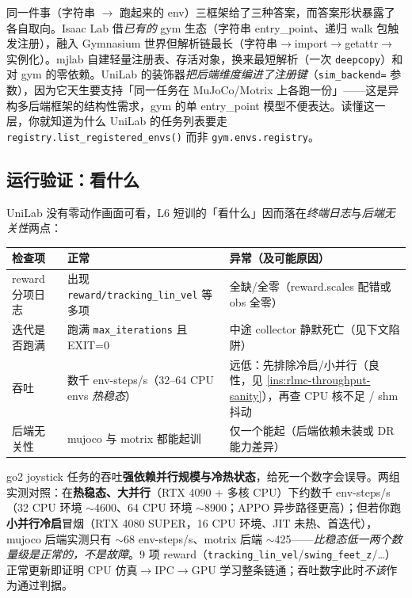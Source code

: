 \begin{insight}\label{ins:rlmc-three-registries}
同一件事（字符串 $\to$ 跑起来的 env）三框架给了三种答案，而答案形状暴露了各自取向。Isaac Lab 借\emph{已有的} gym 生态（字符串 entry\_point、递归 walk 包触发注册），融入 Gymnasium 世界但解析链最长（字符串$\to$import$\to$getattr$\to$实例化）。mjlab 自建轻量注册表、存活对象，换来最短解析（一次 \verb|deepcopy|）和对 gym 的零依赖。UniLab 的装饰器\emph{把后端维度编进了注册键}（\verb|sim_backend=| 参数），因为它天生要支持「同一任务在 MuJoCo/Motrix 上各跑一份」——这是异构多后端框架的结构性需求，gym 的单 entry\_point 模型不便表达。读懂这一层，你就知道为什么 UniLab 的任务列表要走 \verb|registry.list_registered_envs()| 而非 \verb|gym.envs.registry|。
\end{insight}

\subsection{运行验证：看什么}

UniLab 没有零动作画面可看，L6 短训的「看什么」因而落在\emph{终端日志}与\emph{后端无关性}两点：

\begin{center}
\small
\begin{tabular}{@{}lll@{}}
\toprule
检查项 & 正常 & 异常（及可能原因） \\
\midrule
reward 分项日志 & 出现 \verb|reward/tracking_lin_vel| 等多项 & 全缺/全零（reward.scales 配错或 obs 全零） \\
迭代是否跑满 & 跑满 \verb|max_iterations| 且 EXIT=0 & 中途 collector 静默死亡（见下文陷阱） \\
吞吐 & 数千 env-steps/s（32--64 CPU envs \emph{热稳态}） & 远低：先排除冷启/小并行（良性，见 \cref{ins:rlmc-throughput-sanity}），再查 CPU 核不足 / shm 抖动 \\
后端无关性 & mujoco 与 motrix 都能起训 & 仅一个能起（后端依赖未装或 DR 能力差异） \\
\bottomrule
\end{tabular}
\end{center}

go2 joystick 任务的吞吐\textbf{强依赖并行规模与冷热状态}，给死一个数字会误导。两组实测对照：在\textbf{热稳态、大并行}（RTX 4090 + 多核 CPU）下约数千 env-steps/s（32 CPU 环境 $\sim$4600、64 CPU 环境 $\sim$8900；APPO 异步路径更高）；但若你跑\textbf{小并行冷启}冒烟（RTX 4080 SUPER，16 CPU 环境、JIT 未热、首迭代），mujoco 后端实测只有 $\sim$68 env-steps/s、motrix 后端 $\sim$425——\emph{比稳态低一两个数量级是正常的，不是故障}。9 项 reward（\verb|tracking_lin_vel|/\verb|swing_feet_z|/\dots）正常更新即证明 CPU 仿真$\to$IPC$\to$GPU 学习整条链通；吞吐数字此时\emph{不该}作为通过判据。

